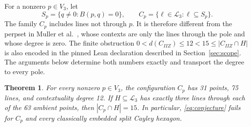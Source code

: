 \documentclass[10pt]{article}
\newtheorem{theorem}{Theorem}
\newcommand{\LL}{\mathcal L}
\begin{document}
For a nonzero $p\in V_3$, let
\[
 S_p=\{q\ne0:B(p,q)=0\},\qquad
 C_p=\{\ell\in\LL_3:\ell\subseteq S_p\}.
\]
The family $C_p$ includes lines not through $p$. It is therefore different
from the perpset in Muller et al.~\cite[Section~2 and Proposition~2]{muller},
whose contexts are only the lines through the pole and whose degree is zero.
The finite obstruction $0<d(C_{IIZ})\le12<15\le|C_{IIZ}\cap H|$ is also
encoded in the pinned Lean declaration described in Section~\ref{sec:scope}.
The arguments below determine both numbers exactly and transport the degree
to every pole.

\begin{theorem}\label{thm:main}
For every nonzero $p\in V_3$, the configuration $C_p$ has 31 points, 75 lines,
and contextuality degree 12. If $H\subseteq\LL_3$ has exactly three lines
through each of the 63 ambient points, then $|C_p\cap H|=15$.
In particular, \eqref{eq:conjecture} fails for $C_p$ and every classically
embedded split Cayley hexagon.
\end{theorem}
\end{document}
